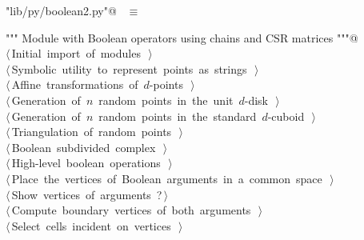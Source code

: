 \documentclass[11pt,oneside]{article}	%
\begin{document}
\begin{flushleft} \small
\begin{minipage}{\linewidth} \label{scrap22}
\verb@"lib/py/boolean2.py"@\nobreak\ {\footnotesize {} }$\equiv$
\vspace{-1ex}
\begin{list}{}{} \item
\mbox{}\verb@""" Module with Boolean operators using chains and CSR matrices """@\\
\mbox{}\verb@@\hbox{$\langle\,$Initial import of modules\nobreak\ {\footnotesize {}}$\,\rangle$}\verb@@\\
\mbox{}\verb@@\hbox{$\langle\,$Symbolic utility to represent points as strings\nobreak\ {\footnotesize {}}$\,\rangle$}\verb@@\\
\mbox{}\verb@@\hbox{$\langle\,$Affine transformations of $d$-points\nobreak\ {\footnotesize {}}$\,\rangle$}\verb@@\\
\mbox{}\verb@@\hbox{$\langle\,$Generation of $n$ random points in the unit $d$-disk\nobreak\ {\footnotesize {}}$\,\rangle$}\verb@@\\
\mbox{}\verb@@\hbox{$\langle\,$Generation of $n$ random points in the standard $d$-cuboid\nobreak\ {\footnotesize {}}$\,\rangle$}\verb@@\\
\mbox{}\verb@@\hbox{$\langle\,$Triangulation of random points\nobreak\ {\footnotesize {}}$\,\rangle$}\verb@@\\
\mbox{}\verb@@\hbox{$\langle\,$Boolean subdivided complex\nobreak\ {\footnotesize {}}$\,\rangle$}\verb@@\\
\mbox{}\verb@@\hbox{$\langle\,$High-level boolean operations\nobreak\ {\footnotesize {}}$\,\rangle$}\verb@@\\
\mbox{}\verb@@\hbox{$\langle\,$Place the vertices of Boolean arguments in a common space\nobreak\ {\footnotesize {}}$\,\rangle$}\verb@@\\
\mbox{}\verb@@\hbox{$\langle\,$Show vertices of arguments\nobreak\ {\footnotesize ?}$\,\rangle$}\verb@@\\
\mbox{}\verb@@\hbox{$\langle\,$Compute boundary vertices of both arguments\nobreak\ {\footnotesize {}}$\,\rangle$}\verb@@\\
\mbox{}\verb@@\hbox{$\langle\,$Select cells incident on vertices\nobreak\ {\footnotesize {}}$\,\rangle$}\verb@@\\

\end{list}
\end{minipage}
\end{flushleft}
\end{document}
